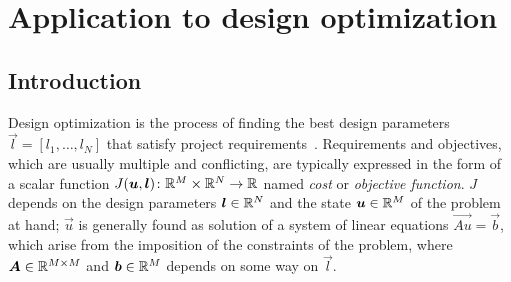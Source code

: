 



\section{Application to design optimization}


\subsection{Introduction}

Design optimization is the process of finding the best design parameters $\vec{l} = [l_1, \dots, l_N]$ that satisfy project requirements~\cite{Matlab:design_opt}. Requirements and objectives, which are usually multiple and conflicting, are typically expressed in the form of a scalar function $J(\boldsymbol{u},\boldsymbol{l}) \colon \mathbb{R}^M\times\mathbb{R}^N \to \mathbb{R}$ named \emph{cost} or \emph{objective function}. $J$ depends on the design parameters $\boldsymbol{l} \in \mathbb{R}^N$ and the state $\boldsymbol{u} \in \mathbb{R}^M$ of the problem at hand; $\vec{u}$ is generally found as solution of a system of linear equations $\vec{Au} = \vec{b}$, which arise from the imposition of the constraints of the problem, where $\boldsymbol{A} \in \mathbb{R}^{M \times M}$ and $\boldsymbol{b} \in \mathbb{R}^M$ depends on some way on $\vec{l}$.

